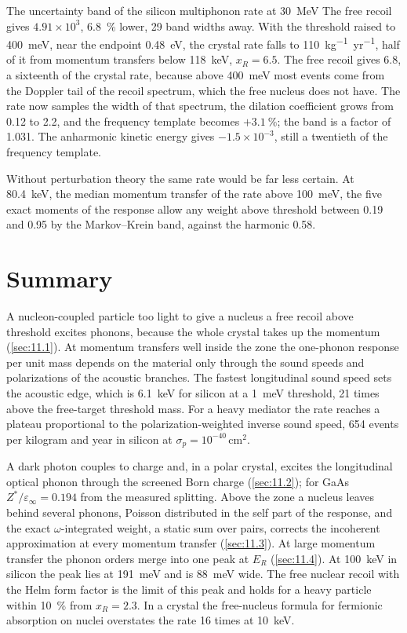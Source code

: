 \begin{workedexample}{The uncertainty band of the silicon multiphonon rate at \SI{30}{MeV}}
The free recoil gives $4.91\times10^3$, \SI{6.8}{\percent} lower, 29 band widths away. With the threshold raised to \SI{400}{meV}, near the endpoint \SI{0.48}{eV}, the crystal rate falls to \SI{110}{kg^{-1}.yr^{-1}}, half of it from momentum transfers below \SI{118}{keV}, $x_R = 6.5$. The free recoil gives 6.8, a sixteenth of the crystal rate, because above \SI{400}{meV} most events come from the Doppler tail of the recoil spectrum, which the free nucleus does not have. The rate now samples the width of that spectrum, the dilation coefficient grows from 0.12 to 2.2, and the frequency template becomes $+\SI{3.1}{\percent}$; the band is a factor of 1.031. The anharmonic kinetic energy gives $-1.5\times10^{-3}$, still a twentieth of the frequency template.

Without perturbation theory the same rate would be far less certain. At \SI{80.4}{keV}, the median momentum transfer of the rate above \SI{100}{meV}, the five exact moments of the response allow any weight above threshold between 0.19 and 0.95 by the Markov--Krein band, against the harmonic 0.58.
\end{workedexample}

\section*{Summary}

A nucleon-coupled particle too light to give a nucleus a free recoil above threshold excites phonons, because the whole crystal takes up the momentum (\cref{sec:11.1}). At momentum transfers well inside the zone the one-phonon response per unit mass depends on the material only through the sound speeds and polarizations of the acoustic branches. The fastest longitudinal sound speed sets the acoustic edge, which is \SI{6.1}{keV} for silicon at a \SI{1}{meV} threshold, 21 times above the free-target threshold mass. For a heavy mediator the rate reaches a plateau proportional to the polarization-weighted inverse sound speed, 654 events per kilogram and year in silicon at $\sigma_p = 10^{-40}\,\mathrm{cm^2}$.

A dark photon couples to charge and, in a polar crystal, excites the longitudinal optical phonon through the screened Born charge (\cref{sec:11.2}); for GaAs $Z^*/\varepsilon_\infty = 0.194$ from the measured splitting. Above the zone a nucleus leaves behind several phonons, Poisson distributed in the self part of the response, and the exact $\omega$-integrated weight, a static sum over pairs, corrects the incoherent approximation at every momentum transfer (\cref{sec:11.3}). At large momentum transfer the phonon orders merge into one peak at $E_R$ (\cref{sec:11.4}). At \SI{100}{keV} in silicon the peak lies at \SI{191}{meV} and is \SI{88}{meV} wide. The free nuclear recoil with the Helm form factor is the limit of this peak and holds for a heavy particle within \SI{10}{\percent} from $x_R = 2.3$. In a crystal the free-nucleus formula for fermionic absorption on nuclei overstates the rate 16 times at \SI{10}{keV}.

